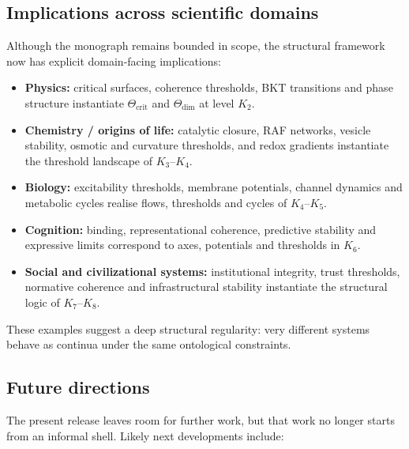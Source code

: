 \subsection{Implications across scientific domains}

Although the monograph remains bounded in scope, the structural framework now
has explicit domain-facing implications:

\begin{itemize}
    \item \textbf{Physics:} critical surfaces, coherence thresholds, BKT transitions and phase structure instantiate
          \(\Theta_{\mathrm{crit}}\) and \(\Theta_{\mathrm{dim}}\) at level \(K_2\).
    \item \textbf{Chemistry / origins of life:} catalytic closure, RAF networks, vesicle stability,
          osmotic and curvature thresholds, and redox gradients instantiate the threshold landscape of \(K_3\)–\(K_4\).
    \item \textbf{Biology:} excitability thresholds, membrane potentials, channel dynamics and
          metabolic cycles realise flows, thresholds and cycles of \(K_4\)–\(K_5\).
    \item \textbf{Cognition:} binding, representational coherence, predictive stability and expressive limits
          correspond to axes, potentials and thresholds in \(K_6\).
    \item \textbf{Social and civilizational systems:} institutional integrity, trust thresholds,
          normative coherence and infrastructural stability instantiate the structural logic of \(K_7\)–\(K_8\).
\end{itemize}

These examples suggest a deep structural regularity:
very different systems behave as continua under the same ontological constraints.

\subsection{Future directions}

The present release leaves room for further work, but that work no longer
starts from an informal shell. Likely next developments include:

